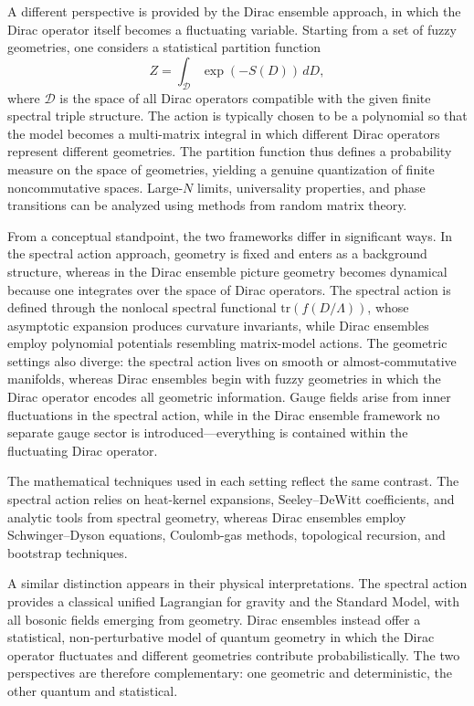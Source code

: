 \documentclass[11pt]{article}
\theoremstyle{plain}
\begin{document}
A different perspective is provided by the Dirac ensemble approach, in which the Dirac
operator itself becomes a fluctuating variable.  
Starting from a set of fuzzy geometries, one considers a statistical partition function
\[
Z = \int_{\mathcal{D}} \exp\!\left( - S(D) \right)\, dD,
\]
where $\mathcal{D}$ is the space of all Dirac operators compatible with the given
finite spectral triple structure.  
The action is typically chosen to be a polynomial so that the model becomes a multi-matrix
integral in which different Dirac operators represent different geometries.  
The partition function thus defines a probability measure on the space of geometries,
yielding a genuine quantization of finite noncommutative spaces.  
Large-$N$ limits, universality properties, and phase transitions can be analyzed using
methods from random matrix theory.

\medskip

From a conceptual standpoint, the two frameworks differ in significant ways.
In the spectral action approach, geometry is fixed and enters as a background structure,
whereas in the Dirac ensemble picture geometry becomes dynamical because one integrates
over the space of Dirac operators.  
The spectral action is defined through the nonlocal spectral functional
$\mathrm{tr}(f(D/\Lambda))$, whose asymptotic expansion produces curvature invariants, 
while Dirac ensembles employ polynomial potentials resembling matrix-model actions.  
The geometric settings also diverge: the spectral action lives on smooth or
almost-commutative manifolds, whereas Dirac ensembles begin with fuzzy geometries in
which the Dirac operator encodes all geometric information.  
Gauge fields arise from inner fluctuations in the spectral action, while in the Dirac
ensemble framework no separate gauge sector is introduced—everything is contained within
the fluctuating Dirac operator.

The mathematical techniques used in each setting reflect the same contrast.
The spectral action relies on heat-kernel expansions, Seeley--DeWitt coefficients, and
analytic tools from spectral geometry, whereas Dirac ensembles employ Schwinger--Dyson
equations, Coulomb-gas methods, topological recursion, and bootstrap techniques.

A similar distinction appears in their physical interpretations.
The spectral action provides a classical unified Lagrangian for gravity and the Standard
Model, with all bosonic fields emerging from geometry.  
Dirac ensembles instead offer a statistical, non-perturbative model of quantum geometry in
which the Dirac operator fluctuates and different geometries contribute probabilistically.
The two perspectives are therefore complementary: one geometric and deterministic, the
other quantum and statistical.
\end{document}
